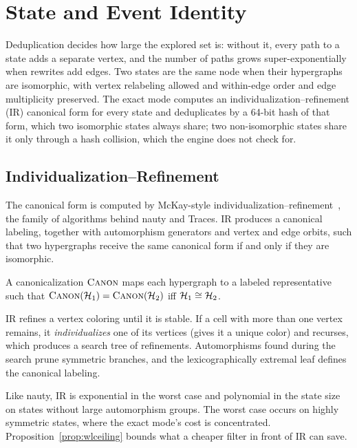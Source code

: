 \section{State and Event Identity}
\label{sec:canonicalization}

Deduplication decides how large the explored set is: without it, every path to a state adds a separate vertex, and the number of paths grows super-exponentially when rewrites add edges. Two states are the same node when their hypergraphs are isomorphic, with vertex relabeling allowed and within-edge order and edge multiplicity preserved. The exact mode computes an individualization--refinement (IR) canonical form for every state and deduplicates by a 64-bit hash of that form, which two isomorphic states always share; two non-isomorphic states share it only through a hash collision, which the engine does not check for.

\subsection{Individualization--Refinement}
\label{sec:ir}

The canonical form is computed by McKay-style individualization--refinement~\cite{mckay2014practical}, the family of algorithms behind nauty and Traces. IR produces a canonical labeling, together with automorphism generators and vertex and edge orbits, such that two hypergraphs receive the same canonical form if and only if they are isomorphic.

\begin{definition}
A canonicalization $\textup{\textsc{Canon}}$ maps each hypergraph to a labeled representative such that $\textup{\textsc{Canon}}(\mathcal{H}_1) = \textup{\textsc{Canon}}(\mathcal{H}_2)$ iff $\mathcal{H}_1 \cong \mathcal{H}_2$.
\end{definition}

IR refines a vertex coloring until it is stable. If a cell with more than one vertex remains, it \emph{individualizes} one of its vertices (gives it a unique color) and recurses, which produces a search tree of refinements. Automorphisms found during the search prune symmetric branches, and the lexicographically extremal leaf defines the canonical labeling.

\begin{remark}[Complexity]
Like nauty, IR is exponential in the worst case and polynomial in the state size on states without large automorphism groups. The worst case occurs on highly symmetric states, where the exact mode's cost is concentrated. Proposition~\ref{prop:wlceiling} bounds what a cheaper filter in front of IR can save.
\end{remark}

